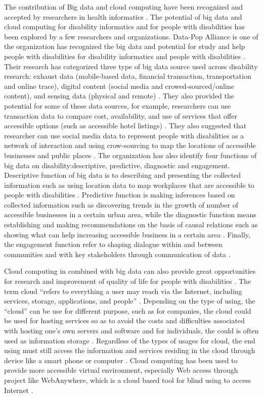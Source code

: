 The contribution of Big data and cloud computing have been recognized and accepted by researchers in 
health informatics \cite{7047725}. The potential of big data and cloud computing for disability 
informatics and for people with disabilities has 
been explored by a few researchers and organizations. Data-Pop Alliance is one of the organization has recognized 
the big data and potential for study and help people with disabilities for disability informatics and people 
with disabilities \cite{Datapop}. Their research has categorized three type of big data source used across disability
research: exhaust data (mobile-based data, financial transaction, transportation and online trace), digital 
content (social media and crowed-sourced/online content), and sensing data (physical and remote) \cite{Datapop}. 
They also provided the potential for some of these data sources, for example, researchers can use transaction 
data to compare cost, availability, and use of services that offer accessible options (such as accessible hotel 
listings) \cite{Datapop}. They also suggested that researcher can use social media data to represent people with
disabilities as a network of interaction and using crow-sourcing to map the locations of accessible businesses 
and public places \cite{Datapop}. 
The organization has also identify four functions of big data on disability:descriptive, predictive, diagnostic 
and engagement. Descriptive function of big data is to describing and presenting the collected information such
as using location data to map workplaces that are accessible to people with disabilities \cite{Datapop}. 
Predictive function is making inferences based on collected information such as discovering trends in the 
growth of number of accessible businesses in a certain urban area, while the diagnostic function means
establishing and making recommendations on the basis of causal relations such as showing what can help 
increasing accessible business in a certain area \cite{Datapop}. Finally, the engagement function refer
to shaping dialogue within and between communities and with key stakeholders through communication of data \cite{Datapop}.


Cloud computing in combined with big data can also provide great opportunities for research and improvement of
quality of life for people with disabilities \cite{Caldwell2011}. The term cloud ``refers to everything a user may reach via the 
Internet, including services, storage, applications, and people'' \cite{Hoehl2010}. Depending on the type of 
using, the ``cloud'' can be use for different purpose, such as for companies, the cloud could be used for hosting
services so as to avoid the costs and difficulties associated with hosting one’s own servers and software and for
individuals, the could is often used as information storage \cite{Khazaei14}. Regardless of the types of usages 
for cloud, the end using must still access the information and services residing in the cloud through device like
a smart phone or computer \cite{Hoehl2010}. Cloud computing has been used to provide more accessible virtual 
environment, especially Web access through project like WebAnywhere, which is a cloud based tool for blind using 
to access Internet \cite{Hoehl2010}. 

